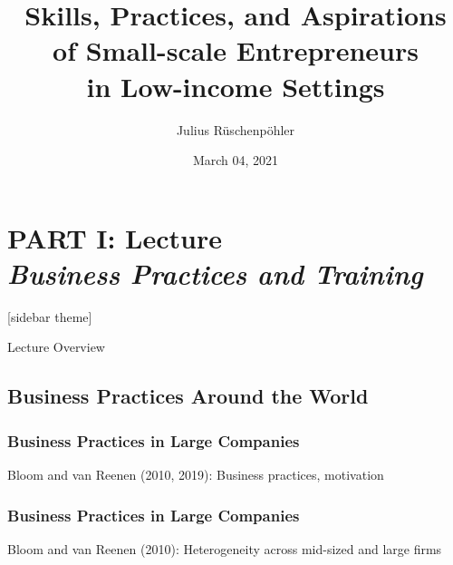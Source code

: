\documentclass[hideothersubsections, usenames,dvipsnames,11pt]{beamer}
\title[]{Skills, Practices, and Aspirations \\ of Small-scale Entrepreneurs \\ in Low-income Settings}
\author[]{Julius R{\"u}schenp{\"o}hler\inst{}}
\institute[]{\inst{} UC Berkeley, CEGA}
\date{March 04, 2021}
\newenvironment{itemize_2pt}{\itemize\addtolength{\itemsep}{2pt}}{\enditemize}
\begin{document}
\section{\textbf{PART I: Lecture} \\ \quad \emph{Business Practices and Training}}



\begin{frame}
\titlepage
\end{frame}


[sidebar theme]

\begin{frame}{Lecture Overview}
\end{frame}


\subsection{Business Practices Around the World}

\begin{frame}
\frametitle{Business Practices in Large Companies}
	\begin{itemize_2pt}
	\item Bloom and van Reenen (2010, 2019): Business practices, motivation \citep{Bloom2010, Bloom2019}
	\vspace{0.1in}
	\end{itemize_2pt}
\end{frame}

\begin{frame}
\frametitle{Business Practices in Large Companies}
	\begin{itemize_2pt}
	\item Bloom and van Reenen (2010): Heterogeneity across mid-sized and large firms \citep{Bloom2010, Bloom2016, Bloom2019}
	\end{itemize_2pt}
\end{frame}


\end{document}

